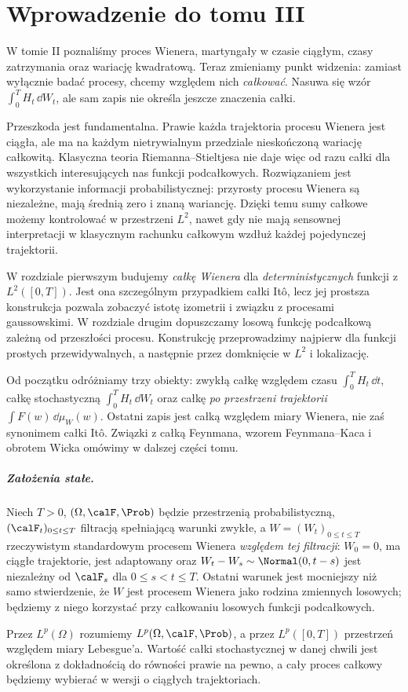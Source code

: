 \chapter*{Wprowadzenie do tomu III}
W tomie II poznaliśmy proces Wienera, martyngały w czasie ciągłym,
czasy zatrzymania oraz wariację kwadratową. Teraz zmieniamy punkt
widzenia: zamiast wyłącznie badać procesy, chcemy względem nich
\emph{całkować}. Nasuwa się wzór $\int_0^T H_t\,\dd W_t$, ale
sam zapis nie określa jeszcze znaczenia całki.

Przeszkoda jest fundamentalna. Prawie każda trajektoria procesu Wienera
jest ciągła, ale ma na każdym nietrywialnym przedziale nieskończoną
wariację całkowitą. Klasyczna teoria Riemanna--Stieltjesa nie daje więc
od razu całki dla wszystkich interesujących nas funkcji podcałkowych.
Rozwiązaniem jest wykorzystanie informacji probabilistycznej:
przyrosty procesu Wienera są niezależne, mają średnią zero i znaną
wariancję. Dzięki temu sumy całkowe możemy kontrolować w przestrzeni
$L^2$, nawet gdy nie mają sensownej interpretacji w klasycznym
rachunku całkowym wzdłuż każdej pojedynczej trajektorii.

W rozdziale pierwszym budujemy \emph{całkę Wienera} dla
\emph{deterministycznych} funkcji z $L^2([0,T])$. Jest ona szczególnym
przypadkiem całki Itô, lecz jej prostsza konstrukcja pozwala zobaczyć
istotę izometrii i związku z procesami gaussowskimi. W rozdziale
drugim dopuszczamy losową funkcję podcałkową zależną od przeszłości
procesu. Konstrukcję przeprowadzimy najpierw dla funkcji prostych
przewidywalnych, a następnie przez domknięcie w $L^2$ i lokalizację.

Od początku odróżniamy trzy obiekty: zwykłą całkę względem czasu
$\int_0^T H_t\,\dd t$, całkę stochastyczną
$\int_0^T H_t\,\dd W_t$ oraz całkę \emph{po przestrzeni trajektorii}
$\int F(w)\,\dd\mu_W(w)$. Ostatni zapis jest całką względem miary
Wienera, nie zaś synonimem całki Itô. Związki z całką Feynmana,
wzorem Feynmana--Kaca i obrotem Wicka omówimy w dalszej części tomu.

\paragraph{Założenia stałe.}
Niech $T>0$, $(\Omega,\calF,\Prob)$ będzie przestrzenią probabilistyczną,
$(\calF_t)_{0\le t\le T}$ filtracją spełniającą warunki zwykłe,
a $W=(W_t)_{0\le t\le T}$ rzeczywistym standardowym procesem Wienera
\emph{względem tej filtracji}: $W_0=0$, ma ciągłe trajektorie,
jest adaptowany oraz $W_t-W_s\sim\Normal(0,t-s)$ jest niezależny
od $\calF_s$ dla $0\le s<t\le T$. Ostatni warunek jest mocniejszy
niż samo stwierdzenie, że $W$ jest procesem Wienera jako rodzina
zmiennych losowych; będziemy z niego korzystać przy całkowaniu
losowych funkcji podcałkowych.

Przez $L^p(\Omega)$ rozumiemy $L^p(\Omega,\calF,\Prob)$,
a przez $L^p([0,T])$ przestrzeń względem miary Lebesgue'a.
Wartość całki stochastycznej w danej chwili jest określona z dokładnością
do równości prawie na pewno, a cały proces całkowy będziemy wybierać
w wersji o ciągłych trajektoriach.

